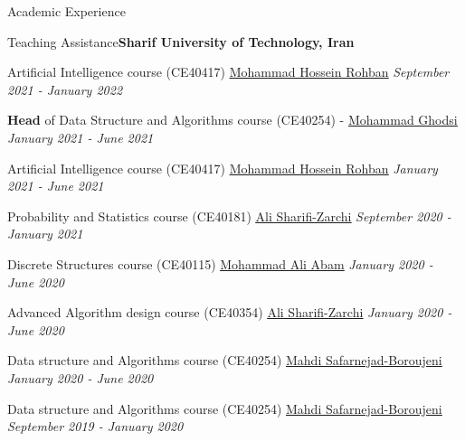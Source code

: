 \documentclass{resume} %
\begin{document}
\begin{rSection}{Academic Experience}
\begin{rSubsection}{Teaching Assistance}{\textcolor{Black!70}{\bf Sharif University of Technology, Iran}}{}{}
\begin{small}
\item Artificial Intelligence course (CE40417) \href{http://blogs.bu.edu/mhrohban/}{\underline{Mohammad Hossein Rohban}} \hfill \textcolor{Black!70}{\it September 2021 - January 2022}
\item {\bf Head}  of Data Structure and Algorithms course (CE40254) - \href{http://sharif.edu/~ghodsi/}{\underline{Mohammad Ghodsi}} \hfill \textcolor{Black!70}{\it January 2021 - June 2021}
\item Artificial Intelligence course (CE40417) \href{http://blogs.bu.edu/mhrohban/}{\underline{Mohammad Hossein Rohban}} \hfill \textcolor{Black!70}{\it January 2021 - June 2021}
\item Probability and Statistics course (CE40181) \href{https://scholar.google.com/citations?user=GbJMZLIAAAAJ&hl=en}{\underline{Ali Sharifi-Zarchi}} \hfill \textcolor{Black!70}{\it September 2020 - January 2021}
\item Discrete Structures course (CE40115) \href{https://scholar.google.com/citations?user=xuNJ-d8AAAAJ&hl=en}{\underline{Mohammad Ali Abam}} \hfill \textcolor{Black!70}{\it January 2020 - June 2020}
\item Advanced Algorithm design course (CE40354) \href{https://scholar.google.com/citations?user=GbJMZLIAAAAJ&hl=en}{\underline{Ali Sharifi-Zarchi}} \hfill \textcolor{Black!70}{\it January 2020 - June 2020} 
\item Data structure and Algorithms course (CE40254) \href{https://scholar.google.com/citations?user=TNfL9SIAAAAJ&hl=en}{\underline{Mahdi Safarnejad-Boroujeni}} \hfill \textcolor{Black!70}{\it January 2020 - June 2020}
\item Data structure and Algorithms course (CE40254) \href{https://scholar.google.com/citations?user=TNfL9SIAAAAJ&hl=en}{\underline{Mahdi Safarnejad-Boroujeni}} \hfill \textcolor{Black!70}{\it September 2019 - January 2020}
\end{small}
\end{rSubsection}
\end{rSection}
\end{document}
